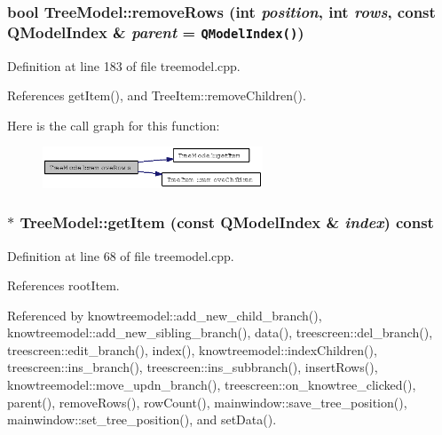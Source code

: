 \subsubsection{\setlength{\rightskip}{0pt plus 5cm}bool Tree\-Model::remove\-Rows (int {\em position}, int {\em rows}, const QModel\-Index \& {\em parent} = {\tt QModelIndex()})}\label{classTreeModel_592fe71d4120128c096980be4094e87d}




Definition at line 183 of file treemodel.cpp.

References get\-Item(), and Tree\-Item::remove\-Children().

Here is the call graph for this function:\begin{figure}[H]
\begin{center}
\leavevmode
\includegraphics[width=186pt]{classTreeModel_592fe71d4120128c096980be4094e87d_cgraph}
\end{center}
\end{figure}
\subsubsection{ $\ast$ Tree\-Model::get\-Item (const QModel\-Index \& {\em index}) const}\label{classTreeModel_4944fbea068c3d4bc7b25f4a7087b5f0}




Definition at line 68 of file treemodel.cpp.

References root\-Item.

Referenced by knowtreemodel::add\_\-new\_\-child\_\-branch(), knowtreemodel::add\_\-new\_\-sibling\_\-branch(), data(), treescreen::del\_\-branch(), treescreen::edit\_\-branch(), index(), knowtreemodel::index\-Children(), treescreen::ins\_\-branch(), treescreen::ins\_\-subbranch(), insert\-Rows(), knowtreemodel::move\_\-updn\_\-branch(), treescreen::on\_\-knowtree\_\-clicked(), parent(), remove\-Rows(), row\-Count(), mainwindow::save\_\-tree\_\-position(), mainwindow::set\_\-tree\_\-position(), and set\-Data().

